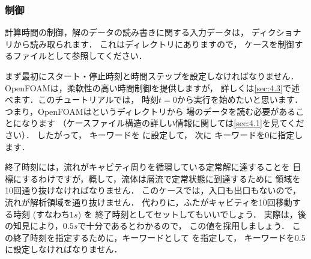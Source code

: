 \subsubsection{制御}
\label{sssec:2.1.1.4}
計算時間の制御，解のデータの読み書きに関する入力データは，
%
%
ディクショナリから読み取られます．
これはディレクトリにありますので，
ケースを制御するファイルとして参照してください．

まず最初にスタート・停止時刻と時間ステップを設定しなければなりません．
OpenFOAMは，柔軟性の高い時間制御を提供しますが，
詳しくは\autoref{sec:4.3}で述べます．このチュートリアルでは，
時刻$t = 0$から実行を始めたいと思います．
つまり，OpenFOAMはというディレクトリから
場のデータを読む必要があることになります
（ケースファイル構造の詳しい情報に関しては\autoref{sec:4.1}を見てください）．
したがって，
%
%
キーワードを
%
%
に設定して，
次に
%
%
キーワードを0に指定します．

終了時刻には，流れがキャビティ周りを循環している定常解に達することを
目標にするわけですが，概して，流体は層流で定常状態に到達するために
領域を10回通り抜けなければなりません．
このケースでは，入口も出口もないので，流れが解析領域を通り抜けません．
代わりに，ふたがキャビティを10回移動する時刻 (すなわち$1\unit{s}$) を
終了時刻としてセットしてもいいでしょう．
実際は，後の知見により，$0.5\unit{s}$で十分であるとわかるので，
この値を採用しましょう．
この終了時刻を指定するために，キーワードとして
を指定して，
%
%
キーワードを0.5に設定しなければなりません．

